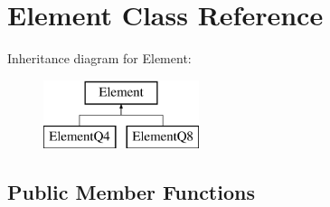 \hypertarget{class_element}{}\section{Element Class Reference}
\label{class_element}
Inheritance diagram for Element\+:\begin{figure}[H]
\begin{center}
\leavevmode
\includegraphics[height=2.000000cm]{class_element}
\end{center}
\end{figure}
\subsection*{Public Member Functions}
